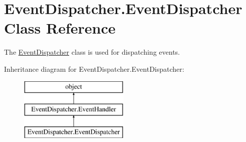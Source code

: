 \hypertarget{class_event_dispatcher_1_1_event_dispatcher}{\section{Event\-Dispatcher.\-Event\-Dispatcher Class Reference}
\label{class_event_dispatcher_1_1_event_dispatcher}
}


The \hyperlink{class_event_dispatcher_1_1_event_dispatcher}{Event\-Dispatcher} class is used for dispatching events.  


Inheritance diagram for Event\-Dispatcher.\-Event\-Dispatcher\-:\begin{figure}[H]
\begin{center}
\leavevmode
\includegraphics[height=3.000000cm]{class_event_dispatcher_1_1_event_dispatcher}
\end{center}
\end{figure}
